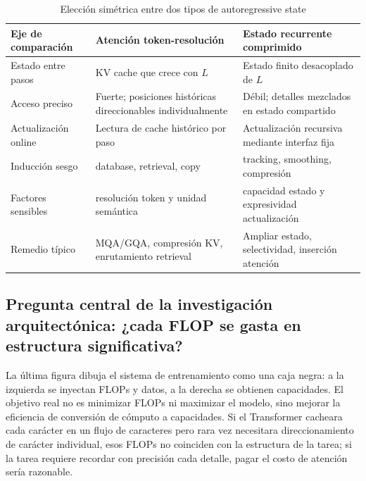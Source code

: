\begin{table}[H]
\centering
\caption{Elección simétrica entre dos tipos de autoregressive state}
\begin{tabularx}{\textwidth}{L{0.18\textwidth}>{\raggedright\arraybackslash}X >{\raggedright\arraybackslash}X}
\toprule
Eje de comparación & Atención token-resolución & Estado recurrente comprimido \\
\midrule
Estado entre pasos & KV cache que crece con $L$ & Estado finito desacoplado de $L$ \\
Acceso preciso & Fuerte; posiciones históricas direccionables individualmente & Débil; detalles mezclados en estado compartido \\
Actualización online & Lectura de cache histórico por paso & Actualización recursiva mediante interfaz fija \\
Inducción sesgo & database, retrieval, copy & tracking, smoothing, compresión \\
Factores sensibles & resolución token y unidad semántica & capacidad estado y expresividad actualización \\
Remedio típico & MQA/GQA, compresión KV, enrutamiento retrieval & Ampliar estado, selectividad, inserción atención \\
\bottomrule
\end{tabularx}
\end{table}

\subsection{Pregunta central de la investigación arquitectónica: ¿cada FLOP se gasta en estructura significativa?}

La última figura dibuja el sistema de entrenamiento como una caja negra: a la izquierda se inyectan FLOPs y datos, a la derecha se obtienen capacidades. El objetivo real no es minimizar FLOPs ni maximizar el modelo, sino mejorar la eficiencia de conversión de cómputo a capacidades. Si el Transformer cacheara cada carácter en un flujo de caracteres pero rara vez necesitara direccionamiento de carácter individual, esos FLOPs no coinciden con la estructura de la tarea; si la tarea requiere recordar con precisión cada detalle, pagar el costo de atención sería razonable.


